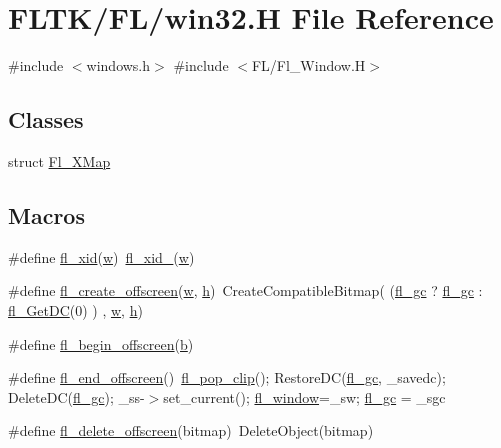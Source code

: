 \hypertarget{win32_8_h}{}\section{F\+L\+T\+K/\+F\+L/win32.H File Reference}
\label{win32_8_h}
{\ttfamily \#include $<$windows.\+h$>$}\newline
{\ttfamily \#include $<$F\+L/\+Fl\+\_\+\+Window.\+H$>$}\newline
\subsection*{Classes}
\begin{DoxyCompactItemize}
\item 
struct \hyperlink{struct_fl___x_map}{Fl\+\_\+\+X\+Map}
\end{DoxyCompactItemize}
\subsection*{Macros}
\begin{DoxyCompactItemize}
\item 
\#define \hyperlink{win32_8_h_a0b95b4c3159c51c43ec553b1959d5b75}{fl\+\_\+xid}(\hyperlink{forms_8_h_aac374e320caaadeca4874add33b62af2}{w})~\hyperlink{x_8_h_a4daabfb0d38b46de684f3d88af173299}{fl\+\_\+xid\+\_\+}(\hyperlink{forms_8_h_aac374e320caaadeca4874add33b62af2}{w})
\item 
\#define \hyperlink{win32_8_h_ac052986a562eabf83386c3f2a209954d}{fl\+\_\+create\+\_\+offscreen}(\hyperlink{forms_8_h_aac374e320caaadeca4874add33b62af2}{w},  \hyperlink{forms_8_h_a7e427ba5b307f9068129699250690066}{h})~Create\+Compatible\+Bitmap( (\hyperlink{x_8_h_a6a655a6955c7b194471666e8055ca876}{fl\+\_\+gc} ? \hyperlink{x_8_h_a6a655a6955c7b194471666e8055ca876}{fl\+\_\+gc} \+: \hyperlink{win32_8_h_ab8c64c29fd758c51d58e815420d3fe61}{fl\+\_\+\+Get\+DC}(0) ) , \hyperlink{forms_8_h_aac374e320caaadeca4874add33b62af2}{w}, \hyperlink{forms_8_h_a7e427ba5b307f9068129699250690066}{h})
\item 
\#define \hyperlink{win32_8_h_a3060ed750ac0363fa1ac0e60ce505054}{fl\+\_\+begin\+\_\+offscreen}(\hyperlink{forms_8_h_a0ba06a290a384fa06b1b90745827dae2}{b})
\item 
\#define \hyperlink{win32_8_h_a51101df672706fe822b8c913e8e4f588}{fl\+\_\+end\+\_\+offscreen}()~\hyperlink{group__fl__drawings_ga7abb216a9a87408c8926126cc9efce22}{fl\+\_\+pop\+\_\+clip}(); Restore\+DC(\hyperlink{x_8_h_a6a655a6955c7b194471666e8055ca876}{fl\+\_\+gc}, \+\_\+savedc); Delete\+DC(\hyperlink{x_8_h_a6a655a6955c7b194471666e8055ca876}{fl\+\_\+gc}); \+\_\+ss-\/$>$set\+\_\+current(); \hyperlink{x_8_h_afdab6664143864c36ba6b51782b32500}{fl\+\_\+window}=\+\_\+sw; \hyperlink{x_8_h_a6a655a6955c7b194471666e8055ca876}{fl\+\_\+gc} = \+\_\+sgc
\item 
\#define \hyperlink{win32_8_h_ad3ee137ce97f62457c9d8bb480a17ea4}{fl\+\_\+delete\+\_\+offscreen}(bitmap)~Delete\+Object(bitmap)
\end{DoxyCompactItemize}
